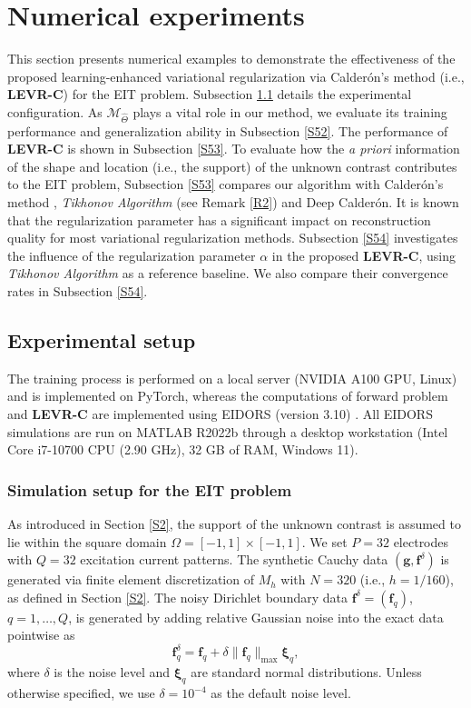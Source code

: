 \documentclass[11pt]{article}
\newcommand{\Calderon}{Calder\'{o}n}
\newcommand{\bds}[1]{\boldsymbol{#1}}
\begin{document}
\section{Numerical experiments}\label{S5}
\setcounter{equation}{0}

This section presents numerical examples to demonstrate the effectiveness of the proposed learning-enhanced variational regularization via \Calderon's method (i.e., \textbf{LEVR-C}) for the EIT problem.
Subsection \ref{S51} details the experimental configuration.
As $\mathcal{M}_{\widehat{\Theta}}$ plays a vital role in our method, we evaluate its training performance and generalization ability in Subsection \ref{S52}.
The performance of \textbf{LEVR-C} is shown in Subsection \ref{S53}.
To evaluate how the \textit{a priori} information of the shape and location (i.e., the support) of the unknown contrast contributes to the EIT problem, Subsection \ref{S53} compares our algorithm with \Calderon's method \cite{CAP80}, \textit{Tikhonov Algorithm} (see Remark \ref{R2}) and Deep \Calderon \cite{CSJ23}.
It is known that the regularization parameter has a significant impact on reconstruction quality for most variational regularization methods.
Subsection \ref{S54} investigates the influence of the regularization parameter $\alpha$ in the proposed \textbf{LEVR-C}, using \textit{Tikhonov Algorithm} as a reference baseline.
We also compare their convergence rates in Subsection \ref{S54}.

\subsection{Experimental setup}\label{S51}
The training process is performed on a local server (NVIDIA A100 GPU, Linux) and is implemented on PyTorch, whereas the computations of forward problem and \textbf{LEVR-C} are implemented using EIDORS (version 3.10) \cite{AAL06}.
All EIDORS simulations are run on MATLAB R2022b through a desktop workstation (Intel Core i7-10700 CPU (2.90 GHz), 32 GB of RAM, Windows 11).

\subsubsection{Simulation setup for the EIT problem}\label{S511}
As introduced in Section \ref{S2}, the support of the unknown contrast is assumed to lie within the square domain $ \Omega=[-1,1]\times [-1,1]$. 
We set $ P=32 $ electrodes with $ Q=32 $ excitation current patterns. 
The synthetic Cauchy data $ (\bds{g}, \bds{f}^\delta) $ is generated via finite element discretization of $ M_h $ with $N=320$ (i.e., $ h=1/160 $), as defined in Section \ref{S2}.
The noisy Dirichlet boundary data $ \bds{f}^\delta = (\bds{f}_q) $, $ q = 1,\ldots, Q$, is generated by adding relative Gaussian noise into the exact data pointwise as
\begin{equation}\label{61}
\bds{f}_q^\delta = \bds{f}_q + \delta\|\bds{f}_q\|_{\max}\bds{\xi}_q,
\end{equation}
where $\delta$ is the noise level and $ \bds{\xi}_q $ are standard normal distributions.
Unless otherwise specified, we use $ \delta = 10^{-4} $ as the default noise level.
\end{document}
